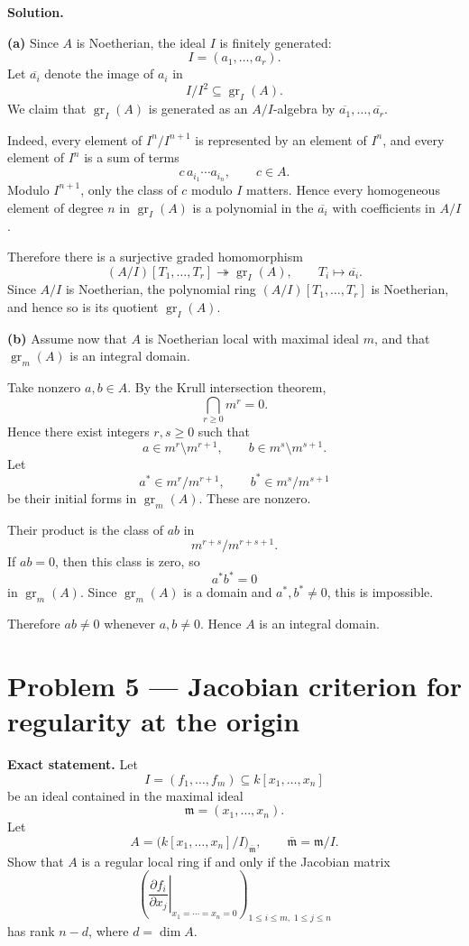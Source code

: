 \documentclass[12pt,a4paper]{article}
\theoremstyle{plain}
\theoremstyle{definition}      %
\begin{document}
	\textbf{Solution.}
	
	\textbf{(a)} Since \(A\) is Noetherian, the ideal \(I\) is finitely generated:
	\[
	I=(a_1,\dots,a_r).
	\]
	Let \(\overline{a_i}\) denote the image of \(a_i\) in
	\[
	I/I^2\subseteq \operatorname{gr}_I(A).
	\]
	We claim that \(\operatorname{gr}_I(A)\) is generated as an \(A/I\)-algebra by \(\overline{a_1},\dots,\overline{a_r}\).
	
	Indeed, every element of \(I^n/I^{n+1}\) is represented by an element of \(I^n\), and every element of \(I^n\) is a sum of terms
	\[
	c\,a_{i_1}\cdots a_{i_n},
	\qquad c\in A.
	\]
	Modulo \(I^{n+1}\), only the class of \(c\) modulo \(I\) matters. Hence every homogeneous element of degree \(n\) in \(\operatorname{gr}_I(A)\) is a polynomial in the \(\overline{a_i}\) with coefficients in \(A/I\).
	
	Therefore there is a surjective graded homomorphism
	\[
	(A/I)[T_1,\dots,T_r]\twoheadrightarrow \operatorname{gr}_I(A),
	\qquad T_i\mapsto \overline{a_i}.
	\]
	Since \(A/I\) is Noetherian, the polynomial ring \((A/I)[T_1,\dots,T_r]\) is Noetherian, and hence so is its quotient \(\operatorname{gr}_I(A)\).
	
	\medskip
	\textbf{(b)} Assume now that $A$ is Noetherian local with maximal ideal $m$, and that $\operatorname{gr}_m(A)$ is an integral domain.
	
	Take nonzero $a,b\in A$. By the Krull intersection theorem,
	\[
	\bigcap_{r\ge 0} m^r=0.
	\]
	Hence there exist integers $r,s\ge 0$ such that
	\[
	a\in m^r\setminus m^{r+1},
	\qquad
	b\in m^s\setminus m^{s+1}.
	\]
	Let
	\[
	a^{*}\in m^r/m^{r+1},
	\qquad
	b^{*}\in m^s/m^{s+1}
	\]
	be their initial forms in $\operatorname{gr}_m(A)$. These are nonzero.
	
	Their product is the class of $ab$ in
	\[
	m^{r+s}/m^{r+s+1}.
	\]
	If $ab=0$, then this class is zero, so
	\[
	a^{*}b^{*}=0
	\]
	in $\operatorname{gr}_m(A)$. Since $\operatorname{gr}_m(A)$ is a domain and $a^{*},b^{*}\neq 0$, this is impossible.
	
	Therefore \(ab\neq 0\) whenever \(a,b\neq 0\). Hence \(A\) is an integral domain.
	
	
	\section*{Problem 5 --- Jacobian criterion for regularity at the origin}
	
	\textbf{Exact statement.}
	Let
	\[
	I=(f_1,\dots,f_m)\subseteq k[x_1,\dots,x_n]
	\]
	be an ideal contained in the maximal ideal
	\[
	\mathfrak m=(x_1,\dots,x_n).
	\]
	Let
	\[
	A=\bigl(k[x_1,\dots,x_n]/I\bigr)_{\bar{\mathfrak m}},
	\qquad
	\bar{\mathfrak m}=\mathfrak m/I.
	\]
	Show that \(A\) is a regular local ring if and only if the Jacobian matrix
	\[
	\left(\left.\frac{\partial f_i}{\partial x_j}\right|_{x_1=\cdots=x_n=0}\right)_
	{1\le i\le m,\;1\le j\le n}
	\]
	has rank \(n-d\), where \(d=\dim A\).
	
\end{document}
